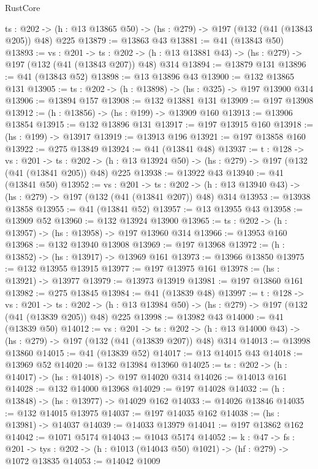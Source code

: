 \begin{lexlean}{RustCore}
\begin{coremodule}
  {ts : @202} -> (h : @13 @13865 @50) -> (hs : @279) -> @197 (@132 (@41 (@13843 @205)) @48) @225
@13879 := @13863 @43
@13881 := @41 (@13843 @50)
@13893 := {vs : @201} ->
  {ts : @202} -> (h : @13 @13881 @43) -> (hs : @279) -> @197 (@132 (@41 (@13843 @207)) @48) @314
@13894 := @13879 @131
@13896 := @41 (@13843 @52)
@13898 := @13 @13896 @43
@13900 := @132 @13865 @131
@13905 := {ts : @202} -> (h : @13898) -> (hs : @325) -> @197 @13900 @314
@13906 := @13894 @157
@13908 := @132 @13881 @131
@13909 := @197 @13908
@13912 := (h : @13856) -> (hs : @199) -> @13909 @160
@13913 := @13906 @13854
@13915 := @132 @13896 @131
@13917 := @197 @13915 @160
@13918 := (hs : @199) -> @13917
@13919 := @13913 @196
@13921 := @197 @13858 @160
@13922 := @275 @13849
@13924 := @41 (@13841 @48)
@13937 := {t : @128} ->
  {vs : @201} ->
  {ts : @202} -> (h : @13 @13924 @50) -> (hs : @279) -> @197 (@132 (@41 (@13841 @205)) @48) @225
@13938 := @13922 @43
@13940 := @41 (@13841 @50)
@13952 := {vs : @201} ->
  {ts : @202} -> (h : @13 @13940 @43) -> (hs : @279) -> @197 (@132 (@41 (@13841 @207)) @48) @314
@13953 := @13938 @13858
@13955 := @41 (@13841 @52)
@13957 := @13 @13955 @43
@13958 := @13909 @52
@13960 := @132 @13924 @13900
@13965 := {ts : @202} -> (h : @13957) -> (hs : @13958) -> @197 @13960 @314
@13966 := @13953 @160
@13968 := @132 @13940 @13908
@13969 := @197 @13968
@13972 := (h : @13852) -> (hs : @13917) -> @13969 @161
@13973 := @13966 @13850
@13975 := @132 @13955 @13915
@13977 := @197 @13975 @161
@13978 := (hs : @13921) -> @13977
@13979 := @13973 @13919
@13981 := @197 @13860 @161
@13982 := @275 @13845
@13984 := @41 (@13839 @48)
@13997 := {t : @128} ->
  {vs : @201} ->
  {ts : @202} -> (h : @13 @13984 @50) -> (hs : @279) -> @197 (@132 (@41 (@13839 @205)) @48) @225
@13998 := @13982 @43
@14000 := @41 (@13839 @50)
@14012 := {vs : @201} ->
  {ts : @202} -> (h : @13 @14000 @43) -> (hs : @279) -> @197 (@132 (@41 (@13839 @207)) @48) @314
@14013 := @13998 @13860
@14015 := @41 (@13839 @52)
@14017 := @13 @14015 @43
@14018 := @13969 @52
@14020 := @132 @13984 @13960
@14025 := {ts : @202} -> (h : @14017) -> (hs : @14018) -> @197 @14020 @314
@14026 := @14013 @161
@14028 := @132 @14000 @13968
@14029 := @197 @14028
@14032 := (h : @13848) -> (hs : @13977) -> @14029 @162
@14033 := @14026 @13846
@14035 := @132 @14015 @13975
@14037 := @197 @14035 @162
@14038 := (hs : @13981) -> @14037
@14039 := @14033 @13979
@14041 := @197 @13862 @162
@14042 := @1071 @5174
@14043 := @1043 @5174
@14052 := {k : @47} ->
  {fs : @201} -> {tys : @202} -> (h : @1013 (@14043 @50) @1021) -> (hf : @279) -> @1072 @13835
@14053 := @14042 @1009

\end{coremodule}
\end{lexlean}
